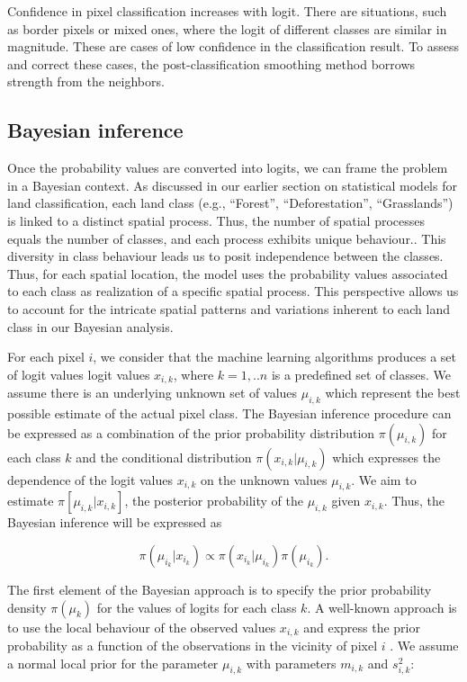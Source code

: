 \documentclass[
  shortnames]{jss}
\begin{document}
Confidence in pixel classification increases with logit. There are situations, such as border pixels or mixed ones, where the logit of different classes are similar in magnitude. These are cases of low confidence in the classification result. To assess and correct these cases, the post-classification smoothing method borrows strength from the neighbors.

\hypertarget{bayesian-inference}{%
\subsection{Bayesian inference}\label{bayesian-inference}}

Once the probability values are converted into logits, we can frame the problem in a Bayesian context. As discussed in our earlier section on statistical models for land classification, each land class (e.g., ``Forest'', ``Deforestation'', ``Grasslands'') is linked to a distinct spatial process. Thus, the number of spatial processes equals the number of classes, and each process exhibits unique behaviour.. This diversity in class behaviour leads us to posit independence between the classes. Thus, for each spatial location, the model uses the probability values associated to each class as realization of a specific spatial process. This perspective allows us to account for the intricate spatial patterns and variations inherent to each land class in our Bayesian analysis.

For each pixel \(i\), we consider that the machine learning algorithms produces a set of logit values logit values \(x_{i,k}\), where \(k = {1,..n}\) is a predefined set of classes. We assume there is an underlying unknown set of values \(\mu_{i,k}\) which represent the best possible estimate of the actual pixel class. The Bayesian inference procedure can be expressed as a combination of the prior probability distribution \(\pi(\mu_{i,k})\) for each class \(k\) and the conditional distribution \(\pi(x_{i,k}|\mu_{i,k})\) which expresses the dependence of the logit values \(x_{i,k}\) on the unknown values \(\mu_{i,k}\). We aim to estimate \(\pi[\mu_{i,k} | x_{i,k}]\), the posterior probability of the \(\mu_{i,k}\) given \(x_{i,k}\). Thus, the Bayesian inference will be expressed as

\begin{equation}
\pi(\mu_{i_k}|x_{i_k}) \propto{} \pi(x_{i_k}|\mu_{i_k})\pi(\mu_{i_k}).
\end{equation}

The first element of the Bayesian approach is to specify the prior probability density \(\pi(\mu_k)\) for the values of logits for each class \(k\). A well-known approach is to use the local behaviour of the observed values \(x_{i,k}\) and express the prior probability as a function of the observations in the vicinity of pixel \(i\) \cite{Besag1991}. We assume a normal local prior for the parameter \(\mu_{i,k}\) with parameters \(m_{i,k}\) and \(s^2_{i,k}\):
\end{document}
